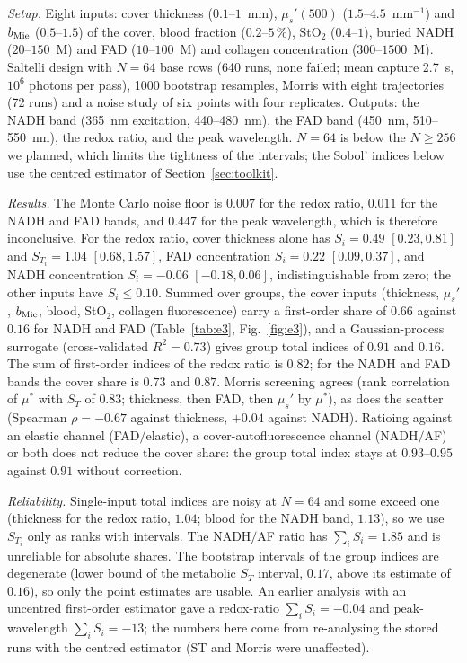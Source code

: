 \documentclass[journal]{IEEEtran}
\newcommand{\musp}{\mu_s'}
\begin{document}
\emph{Setup.} Eight inputs: cover thickness ($0.1$--$1$~mm), $\musp(500)$ ($1.5$--$4.5$~mm$^{-1}$) and $b_{\rm Mie}$ ($0.5$--$1.5$) of the cover, blood fraction ($0.2$--$5\,\%$), StO$_2$ ($0.4$--$1$), buried NADH ($20$--$150$~\textmu M) and FAD ($10$--$100$~\textmu M) and collagen concentration ($300$--$1500$~\textmu M). Saltelli design with $N=64$ base rows (640 runs, none failed; mean capture 2.7~s, $10^6$ photons per pass), 1000 bootstrap resamples, Morris with eight trajectories (72 runs) and a noise study of six points with four replicates. Outputs: the NADH band (365~nm excitation, 440--480~nm), the FAD band (450~nm, 510--550~nm), the redox ratio, and the peak wavelength. $N=64$ is below the $N\ge256$ we planned, which limits the tightness of the intervals; the Sobol' indices below use the centred estimator of Section~\ref{sec:toolkit}.

\emph{Results.} The Monte Carlo noise floor is $0.007$ for the redox ratio, $0.011$ for the NADH and FAD bands, and $0.447$ for the peak wavelength, which is therefore inconclusive. For the redox ratio, cover thickness alone has $S_i=0.49$ $[0.23,0.81]$ and $S_{T_i}=1.04$ $[0.68,1.57]$, FAD concentration $S_i=0.22$ $[0.09,0.37]$, and NADH concentration $S_i=-0.06$ $[-0.18,0.06]$, indistinguishable from zero; the other inputs have $S_i\le0.10$. Summed over groups, the cover inputs (thickness, $\musp$, $b_{\rm Mie}$, blood, StO$_2$, collagen fluorescence) carry a first-order share of $0.66$ against $0.16$ for NADH and FAD (Table~\ref{tab:e3}, Fig.~\ref{fig:e3}), and a Gaussian-process surrogate (cross-validated $R^2=0.73$) gives group total indices of $0.91$ and $0.16$. The sum of first-order indices of the redox ratio is $0.82$; for the NADH and FAD bands the cover share is $0.73$ and $0.87$. Morris screening agrees (rank correlation of $\mu^*$ with $S_{T}$ of $0.83$; thickness, then FAD, then $\musp$ by $\mu^*$), as does the scatter (Spearman $\rho=-0.67$ against thickness, $+0.04$ against NADH). Ratioing against an elastic channel (FAD$/$elastic), a cover-autofluorescence channel (NADH$/$AF) or both does not reduce the cover share: the group total index stays at $0.93$--$0.95$ against $0.91$ without correction.

\emph{Reliability.} Single-input total indices are noisy at $N=64$ and some exceed one (thickness for the redox ratio, $1.04$; blood for the NADH band, $1.13$), so we use $S_{T_i}$ only as ranks with intervals. The NADH$/$AF ratio has $\sum_iS_i=1.85$ and is unreliable for absolute shares. The bootstrap intervals of the group indices are degenerate (lower bound of the metabolic $S_T$ interval, $0.17$, above its estimate of $0.16$), so only the point estimates are usable. An earlier analysis with an uncentred first-order estimator gave a redox-ratio $\sum_iS_i=-0.04$ and peak-wavelength $\sum_iS_i=-13$; the numbers here come from re-analysing the stored runs with the centred estimator (ST and Morris were unaffected).
\end{document}
